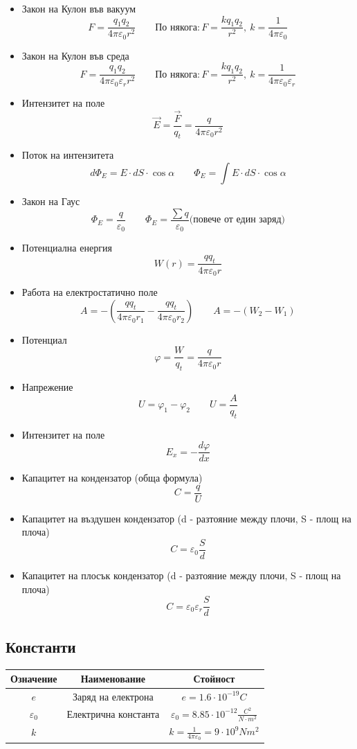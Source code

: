 \documentclass[fleqn, 12pt]{article}
\theoremstyle{definition}
\begin{document}
\begin{itemize}
\item Закон на Кулон във вакуум
$$F = \frac{q_1q_2}{4\pi \varepsilon_0 r^2} \qquad
\text{По някога:}\, F = \frac{kq_1q_2}{r^2}, \ k = \frac{1}{4\pi \varepsilon_0}$$
\item Закон на Кулон във среда
$$F = \frac{q_1q_2}{4\pi \varepsilon_0 \varepsilon_r r^2} \qquad
\text{По някога:}\, F = \frac{kq_1q_2}{r^2}, \ k = \frac{1}{4\pi \varepsilon_0 \varepsilon_r}$$
\item Интензитет на поле 
$$\vec{E} = \frac{\vec{F}}{q_t} = \frac{q}{4\pi \varepsilon_0 r^2}$$
\item Поток на интензитета
$$d\Phi_E = E \cdot dS \cdot \cos \alpha \qquad \Phi_E = \int E \cdot dS \cdot \cos \alpha $$
\item Закон на Гаус
$$\Phi_E = \frac{q}{\varepsilon_0} \qquad \Phi_E = \frac{\sum q}{\varepsilon_0} \text{(повече от един заряд)}$$
\item Потенциална енергия
$$W(r) = \frac{qq_t}{4 \pi \varepsilon_0 r}$$
\item Работа на електростатично поле
$$ A = - \left(\frac{q q_t}{4 \pi \varepsilon_0 r_1} - \frac{q q_t}{4 \pi \varepsilon_0 r_2} \right)
\qquad 
A = -(W_2 - W_1)$$ 
\item Потенциал 
$$\varphi = \frac{W}{q_t} = \frac{q}{4 \pi \varepsilon_0 r}$$
\item Напрежение 
$$U = \varphi_1 - \varphi_2 \qquad U = \frac{A}{q_t}$$
\item Интензитет на поле
$$E_x = -\frac{d\varphi}{dx}$$
\item Капацитет на кондензатор (обща формула)
$$C = \frac{q}{U}$$
\item Капацитет на въздушен кондензатор (d -  разтояние между плочи, S - площ на плоча) 
$$C = \varepsilon_0 \frac{S}{d}$$
\item Капацитет на плосък кондензатор (d -  разтояние между плочи, S - площ на плоча) 
$$C = \varepsilon_0 \varepsilon_r \frac{S}{d}$$
\end{itemize}

\newpage
\subsection{Константи}

\begin{center}
\begin{tabular}{ |c|c|c|}
\hline
\textbf{Означение} & \textbf{Наименование}&\textbf{Стойност}\\
\hline
$e$ & Заряд на електрона & $e =  1.6 \cdot 10^{-19} C$ \\
\hline
$\varepsilon_0$ & Електрична константа & $\varepsilon_0 =  8.85 \cdot 10^{-12} \frac{C^2}{N \cdot m^2}$ \\
\hline
$k$ &  & $ k= \frac{1}{4\pi \varepsilon_0} = 9 \cdot 10^9 Nm^2$ \\
\hline
\end{tabular}
\end{center}
\end{document}
